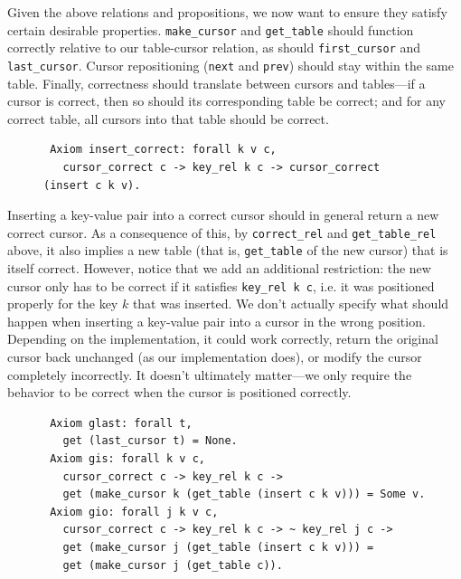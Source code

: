 \documentclass[a4paper,12pt]{article}
\begin{document}
Given the above relations and propositions, we now want to ensure they satisfy certain desirable properties. \texttt{make\_cursor} and \texttt{get\_table} should function correctly relative to our table-cursor relation, as should \texttt{first\_cursor} and \texttt{last\_cursor}. Cursor repositioning (\texttt{next} and \texttt{prev}) should stay within the same table. Finally, correctness should translate between cursors and tables---if a cursor is correct, then so should its corresponding table be correct; and for any correct table, all cursors into that table should be correct.

\begin{figure}[h]
\begin{singlespace}
\begin{verbatim}
 Axiom insert_correct: forall k v c,
   cursor_correct c -> key_rel k c -> cursor_correct (insert c k v).
\end{verbatim}
\end{singlespace}
\end{figure}

Inserting a key-value pair into a correct cursor should in general return a new correct cursor. As a consequence of this, by \texttt{correct\_rel} and \texttt{get\_table\_rel} above, it also implies a new table (that is, \texttt{get\_table} of the new cursor) that is itself correct. However, notice that we add an additional restriction: the new cursor only has to be correct if it satisfies \texttt{key\_rel k c}, i.e. it was positioned properly for the key $k$ that was inserted. We don’t actually specify what should happen when inserting a key-value pair into a cursor in the wrong position. Depending on the implementation, it could work correctly, return the original cursor back unchanged (as our implementation does), or modify the cursor completely incorrectly. It doesn’t ultimately matter---we only require the behavior to be correct when the cursor is positioned correctly.

\begin{figure}[h]
\begin{singlespace}
\begin{verbatim}
 Axiom glast: forall t,
   get (last_cursor t) = None.
 Axiom gis: forall k v c,
   cursor_correct c -> key_rel k c ->
   get (make_cursor k (get_table (insert c k v))) = Some v.
 Axiom gio: forall j k v c,
   cursor_correct c -> key_rel k c -> ~ key_rel j c ->
   get (make_cursor j (get_table (insert c k v))) =
   get (make_cursor j (get_table c)).
\end{verbatim}
\end{singlespace}
\end{figure}
\end{document}
